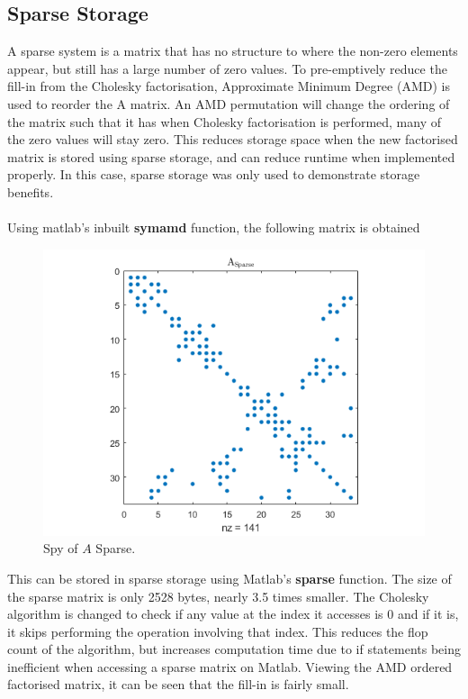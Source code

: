 \documentclass[12pt,a4paper]{article}
\begin{document}
\subsection{Sparse Storage}
A sparse system is a matrix that has no structure to where the non-zero elements appear, but still has a large number of zero values. To pre-emptively reduce the fill-in from the Cholesky factorisation, Approximate Minimum Degree (AMD) is used to reorder the A matrix. An AMD permutation will change the ordering of the matrix such that it has when Cholesky factorisation is performed, many of the zero values will stay zero. This reduces storage space when the new factorised matrix is stored using sparse storage, and can reduce runtime when implemented properly. In this case, sparse storage was only used to demonstrate storage benefits.\\\\Using matlab's inbuilt \textbf{symamd} function, the following matrix is obtained
\begin{figure}[H]
	\includegraphics[width=\linewidth]{images/A_SPARSE.png}
	\caption{Spy of $A$ Sparse.}
	\label{fig:A_SPARSE}
\end{figure}
This can be stored in sparse storage using Matlab's \textbf{sparse} function. The size of the sparse matrix is only 2528 bytes, nearly 3.5 times smaller. The Cholesky algorithm is changed to check if any value at the index it accesses is 0 and if it is, it skips performing the operation involving that index. This reduces the flop count of the algorithm, but increases computation time due to if statements being inefficient when accessing a sparse matrix on Matlab. Viewing the AMD ordered factorised matrix, it can be seen that the fill-in is fairly small.
\end{document}
